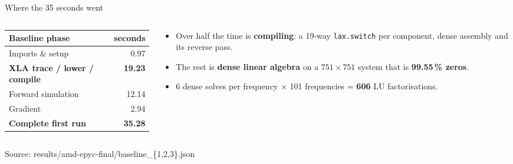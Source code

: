\documentclass[aspectratio=169,11pt]{beamer}
\newcommand{\hl}[1]{\textcolor{accent}{\textbf{#1}}}
\newcommand{\src}[1]{\par\vfill{\color{muted}\scriptsize Source: #1}}
\begin{document}
\begin{frame}{Where the 35 seconds went}
  \begin{columns}[c]
    \begin{column}{0.48\textwidth}
      \begin{tabular}{@{}lr@{}}
        \toprule
        Baseline phase & seconds \\
        \midrule
        Imports \& setup & 0.97 \\
        \hl{XLA trace / lower / compile} & \hl{19.23} \\
        Forward simulation & 12.14 \\
        Gradient & 2.94 \\
        \midrule
        \textbf{Complete first run} & \textbf{35.28} \\
        \bottomrule
      \end{tabular}
    \end{column}
    \begin{column}{0.5\textwidth}
      \begin{itemize}
        \item Over half the time is \hl{compiling}: a 19-way \texttt{lax.switch} per component, dense assembly and its reverse pass.
        \item The rest is \hl{dense linear algebra} on a $751\times751$ system that is \textbf{99.55\,\% zeros}.
        \item 6 dense solves per frequency $\times$ 101 frequencies = \textbf{606} LU factorisations.
      \end{itemize}
    \end{column}
  \end{columns}
  \src{results/amd-epyc-final/baseline\_\{1,2,3\}.json}
\end{frame}
\end{document}
